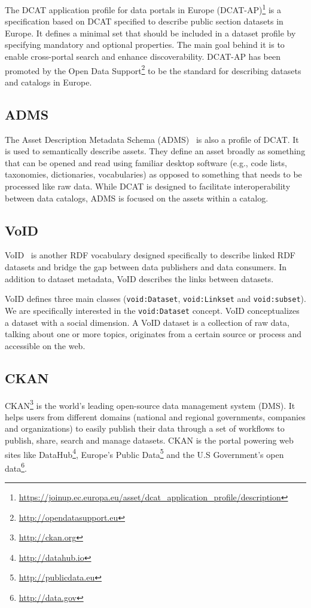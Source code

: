 \documentclass[runningheads,a4paper]{llncs}
\begin{document}
The DCAT application profile for data portals in Europe (DCAT-AP)\footnote{\url{https://joinup.ec.europa.eu/asset/dcat\_application\_profile/description}} is a specification based on DCAT specified to describe public section datasets in Europe. It defines a minimal set that should be included in a dataset profile by specifying mandatory and optional properties. The main goal behind it is to enable cross-portal search and enhance discoverability. DCAT-AP has been promoted by the Open Data Support\footnote{\url{http://opendatasupport.eu}} to be the standard for describing datasets and catalogs in Europe.

\subsection{ADMS}

The Asset Description Metadata Schema (ADMS)~\cite{ADMS:13:W3C} is also a profile of DCAT. It is used to semantically describe assets. They define an asset broadly as something that can be opened and read using familiar desktop software (e.g., code lists, taxonomies, dictionaries, vocabularies) as opposed to something that needs to be processed like raw data. While DCAT is designed to facilitate interoperability between data catalogs, ADMS is focused on the assets within a catalog.

\subsection{VoID}

VoID~\cite{BoHm:2011:CVD:2030805.2031001} is another RDF vocabulary designed specifically to describe linked RDF datasets and bridge the gap between data publishers and data consumers. In addition to dataset metadata, VoID describes the links between datasets.

VoID defines three main classes (\texttt{void:Dataset}, \texttt{void:Linkset} and \texttt{void:subset}). We are specifically interested in the \texttt{void:Dataset} concept. VoID conceptualizes a dataset with a social dimension. A VoID dataset is a collection of raw data, talking about one or more topics, originates from a certain source or process and accessible on the web.

\subsection{CKAN}

CKAN\footnote{\url{http://ckan.org}} is the world's leading open-source data management system (DMS). It helps users from different domains (national and regional governments, companies and organizations) to easily publish their data through a set of workflows to publish, share, search and manage datasets. CKAN is the portal powering web sites like DataHub\footnote{\url{http://datahub.io}}, Europe's Public Data\footnote{\url{http://publicdata.eu}} and the U.S Government's open data\footnote{\url{http://data.gov}}.
\end{document}
